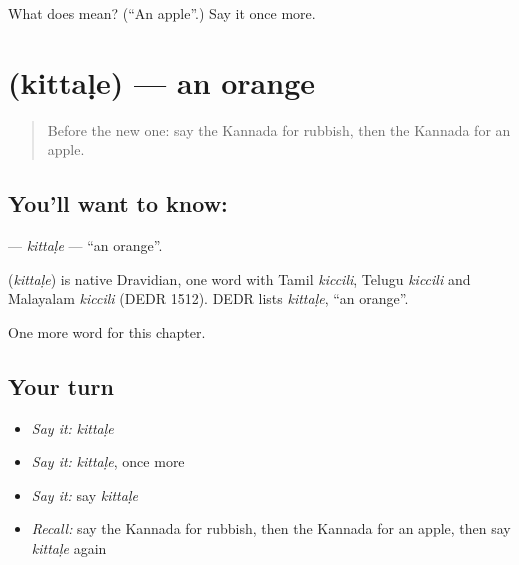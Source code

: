 \begin{tcolorbox}[breakable,colback=teal!4,colframe=teal!35!black,title={Before you move on}]
What does  mean? (\textquotedblleft{}An apple\textquotedblright{}.) Say it once more.
\end{tcolorbox}
\section[\texorpdfstring{\kn{ಕಿತ್ತಳೆ} (kittaḷe)}{ಕಿತ್ತಳೆ (kittaḷe)}]{ (kittaḷe) — an orange}

\label{lesson:KA-C221-kittale}



\begin{quote}
Before the new one: say the Kannada for rubbish, then the Kannada for an apple.
\end{quote}

\subsection*{You'll want to know: }
\textbf{} — \emph{kittaḷe} — \textquotedblleft{}an orange\textquotedblright{}.

\begin{cousinweb}
\textbf{} (\emph{kittaḷe}) is native Dravidian, one word with Tamil \emph{kiccili}, Telugu \emph{kiccili} and Malayalam \emph{kiccili} (DEDR 1512). DEDR lists \emph{kittaḷe}, \textquotedblleft{}an orange\textquotedblright{}.
\end{cousinweb}

\begin{grammarlens}[title={What you've built}]
One more word for this chapter.
\end{grammarlens}

\subsection*{Your turn}
\begin{itemize}
\raggedright
  \item \emph{Say it:} \emph{kittaḷe}
  \item \emph{Say it:} \emph{kittaḷe}, once more
  \item \emph{Say it:} say \emph{kittaḷe}
  \item \emph{Recall:} say the Kannada for rubbish, then the Kannada for an apple, then say \emph{kittaḷe} again
\end{itemize}

